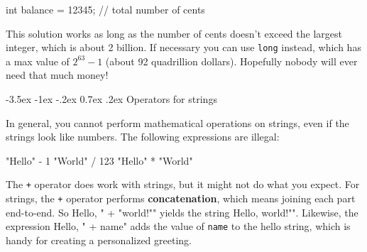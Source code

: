 \documentclass[12pt]{book}
\makeatletter
\theoremstyle{exercise}
\newcommand{\java}[1]{\verb"#1"}
\renewcommand{\section}{\@startsection {section}{1}{\z@}%
    {-3.5ex \@plus -1ex \@minus -.2ex}%
    {0.7ex \@plus.2ex}%
    {\normalfont\Large\bfseries}}
\renewcommand\subsection{\@startsection{subsection}{2}{\z@}%
    {-3.25ex\@plus -1ex \@minus -.2ex}%
    {0.3ex \@plus .2ex}%
    {\normalfont\large\bfseries}}
\newcommand{\java}[1]{\lstinline{#1}} %
\makeatother
\begin{document}
\begin{code}
    int balance = 12345;      // total number of cents
\end{code}


This solution works as long as the number of cents doesn't exceed the largest integer, which is about 2 billion.
If necessary you can use \java{long} instead, which has a max value of $2^{63}-1$ (about 92 quadrillion dollars).
Hopefully nobody will ever need that much money!


\section{Operators for strings}


In general, you cannot perform mathematical operations on strings, even if the strings look like numbers.
The following expressions are illegal:

\begin{code}
    "Hello" - 1     "World" / 123     "Hello" * "World"
\end{code}



The \java{+} operator does work with strings, but it might not do what you expect.
For strings, the \java{+} operator performs {\bf concatenation}, which means joining each part end-to-end.
So \java{"Hello, " + "world!"} yields the string \java{"Hello, world!"}.
Likewise, the expression \java{"Hello, " + name} adds the value of \java{name} to the hello string, which is handy for creating a personalized greeting.



\end{document}
